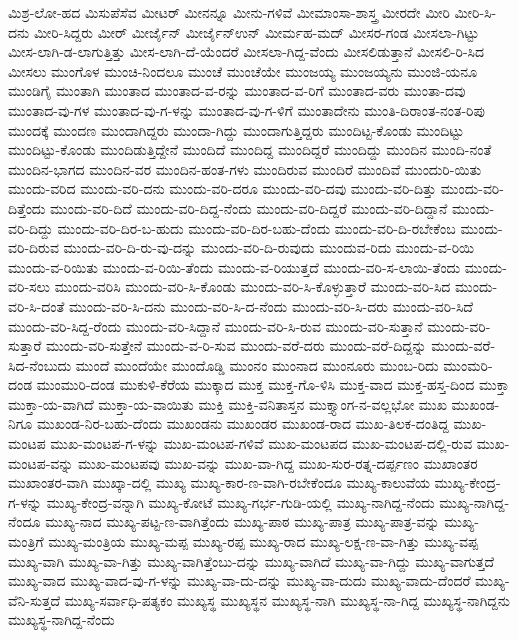 ಮಿಶ್ರ-ಲೋ-ಹದ
ಮಿಸುಪೆಸೆವ
ಮೀಟರ್
ಮೀನನ್ನೂ
ಮೀನು-ಗಳಿವೆ
ಮೀಮಾಂಸಾ-ಶಾಸ್ತ್ರ
ಮೀರದೇ
ಮೀರಿ
ಮೀರಿ-ಸಿ-ದನು
ಮೀರಿ-ಸಿದ್ದರು
ಮೀರ್
ಮೀರ್ಜೈನ್
ಮೀರ್ಜೈನ್ಉನ್
ಮೀರ್ಮಹ-ಮದ್
ಮೀಸರ-ಗಂಡ
ಮೀಸಲಾ-ಗಿಟ್ಟು
ಮೀಸ-ಲಾಗಿ-ಡ-ಲಾಗುತ್ತಿತ್ತು
ಮೀಸ-ಲಾಗಿ-ದೆ-ಯೆಂದರೆ
ಮೀಸಲಾ-ಗಿದ್ದ-ವೆಂದು
ಮೀಸಲಿಡುತ್ತಾನೆ
ಮೀಸಲಿ-ರಿ-ಸಿದ
ಮೀಸಲು
ಮುಂಗೊಳ
ಮುಂಚಿ-ನಿಂದಲೂ
ಮುಂಚೆ
ಮುಂಚೆಯೇ
ಮುಂಜಯ್ಯ
ಮುಂಜಯ್ಯನು
ಮುಂಜಿ-ಯನೂ
ಮುಂಡಿಗೈ
ಮುಂತಾಗಿ
ಮುಂತಾದ
ಮುಂತಾದ-ವ-ರನ್ನು
ಮುಂತಾದ-ವ-ರಿಗೆ
ಮುಂತಾದ-ವರು
ಮುಂತಾ-ದವು
ಮುಂತಾದ-ವು-ಗಳ
ಮುಂತಾದ-ವು-ಗ-ಳನ್ನು
ಮುಂತಾದ-ವು-ಗ-ಳಿಗೆ
ಮುಂತಾದೇನು
ಮುಂತಿ-ದಿರಾಂತ-ನಂತ-ರಿಪು
ಮುಂದಕ್ಕೆ
ಮುಂದಣ
ಮುಂದಾಗಿದ್ದರು
ಮುಂದಾ-ಗಿದ್ದು
ಮುಂದಾಗುತ್ತಿದ್ದರು
ಮುಂದಿಟ್ಟ-ಕೊಂಡು
ಮುಂದಿಟ್ಟು
ಮುಂದಿಟ್ಟು-ಕೊಂಡು
ಮುಂದಿಡುತ್ತಿದ್ದೇನೆ
ಮುಂದಿದೆ
ಮುಂದಿದ್ದ
ಮುಂದಿದ್ದರೆ
ಮುಂದಿದ್ದು
ಮುಂದಿನ
ಮುಂದಿ-ನಂತೆ
ಮುಂದಿನ-ಭಾಗದ
ಮುಂದಿನ-ವರ
ಮುಂದಿನ-ಹಂತ-ಗಳು
ಮುಂದಿರುವ
ಮುಂದಿರೆ
ಮುಂದಿವೆ
ಮುಂದುರಿ-ಯಿತು
ಮುಂದು-ವರಿದ
ಮುಂದು-ವರಿ-ದನು
ಮುಂದು-ವರಿ-ದರೂ
ಮುಂದು-ವರಿ-ದವು
ಮುಂದು-ವರಿ-ದಿತ್ತು
ಮುಂದು-ವರಿ-ದಿತ್ತೆಂದು
ಮುಂದು-ವರಿ-ದಿದೆ
ಮುಂದು-ವರಿ-ದಿದ್ದ-ನೆಂದು
ಮುಂದು-ವರಿ-ದಿದ್ದರೆ
ಮುಂದು-ವರಿ-ದಿದ್ದಾನೆ
ಮುಂದು-ವರಿ-ದಿದ್ದು
ಮುಂದು-ವರಿ-ದಿರ-ಬ-ಹುದು
ಮುಂದು-ವರಿ-ದಿರ-ಬಹು-ದೆಂದು
ಮುಂದು-ವರಿ-ದಿ-ರಬೇಕೆಂಬ
ಮುಂದು-ವರಿ-ದಿರುವ
ಮುಂದು-ವರಿ-ದಿ-ರು-ವು-ದನ್ನು
ಮುಂದು-ವರಿ-ದಿ-ರುವುದು
ಮುಂದುವ-ರಿದು
ಮುಂದು-ವ-ರಿಯಿ
ಮುಂದು-ವ-ರಿಯಿತು
ಮುಂದು-ವ-ರಿಯಿ-ತೆಂದು
ಮುಂದು-ವ-ರಿಯುತ್ತದೆ
ಮುಂದು-ವರಿ-ಸ-ಲಾಯಿ-ತೆಂದು
ಮುಂದು-ವರಿ-ಸಲು
ಮುಂದು-ವರಿಸಿ
ಮುಂದು-ವರಿ-ಸಿ-ಕೊಂಡು
ಮುಂದು-ವರಿ-ಸಿ-ಕೊಳ್ಳುತ್ತಾರೆ
ಮುಂದು-ವರಿ-ಸಿದ
ಮುಂದು-ವರಿ-ಸಿ-ದಂತೆ
ಮುಂದು-ವರಿ-ಸಿ-ದನು
ಮುಂದು-ವರಿ-ಸಿ-ದ-ನೆಂದು
ಮುಂದು-ವರಿ-ಸಿ-ದರು
ಮುಂದು-ವರಿ-ಸಿದೆ
ಮುಂದು-ವರಿ-ಸಿದ್ದ-ರೆಂದು
ಮುಂದು-ವರಿ-ಸಿದ್ದಾನೆ
ಮುಂದು-ವರಿ-ಸಿ-ರುವ
ಮುಂದು-ವರಿ-ಸುತ್ತಾನೆ
ಮುಂದು-ವರಿ-ಸುತ್ತಾರೆ
ಮುಂದು-ವರಿ-ಸುತ್ತೇನೆ
ಮುಂದು-ವ-ರಿ-ಸುವ
ಮುಂದು-ವರೆ-ದರು
ಮುಂದು-ವರೆ-ದಿದ್ದನ್ನು
ಮುಂದು-ವರೆ-ಸಿದ-ನೆಂಬುದು
ಮುಂದೆ
ಮುಂದೆಯೇ
ಮುಂದೊಡ್ಡಿ
ಮುಂನಂ
ಮುಂನಾದ
ಮುಂನೂರು
ಮುಂಬ-ರಿದು
ಮುಂಮರಿ-ದಂಡ
ಮುಂಮುರಿ-ದಂಡ
ಮುಕುಳಿ-ಕೆರೆಯ
ಮುಕ್ಕಾದ
ಮುಕ್ತ
ಮುಕ್ತ-ಗೊ-ಳಿಸಿ
ಮುಕ್ತ-ವಾದ
ಮುಕ್ತ-ಹಸ್ತ-ದಿಂದ
ಮುಕ್ತಾ
ಮುಕ್ತಾ-ಯ-ವಾಗಿದೆ
ಮುಕ್ತಾ-ಯ-ವಾಯಿತು
ಮುಕ್ತಿ
ಮುಕ್ತಿ-ವನಿತಾಸ್ತನ
ಮುಕ್ತ್ಯಾಂಗ-ನ-ವಲ್ಲಭೋ
ಮುಖ
ಮುಖಂಡ-ನಿಗೂ
ಮುಖಂಡ-ನಿರ-ಬಹು-ದೆಂದು
ಮುಖಂಡನು
ಮುಖಂಡರ
ಮುಖಂಡ-ರಾದ
ಮುಖ-ತಿಲಕ-ದಂತಿದ್ದ
ಮುಖ-ಮಂಟಪ
ಮುಖ-ಮಂಟಪ-ಗ-ಳನ್ನು
ಮುಖ-ಮಂಟಪ-ಗಳಿವೆ
ಮುಖ-ಮಂಟಪದ
ಮುಖ-ಮಂಟಪ-ದಲ್ಲಿ-ರುವ
ಮುಖ-ಮಂಟಪ-ವನ್ನು
ಮುಖ-ಮಂಟಪವು
ಮುಖ-ವನ್ನು
ಮುಖ-ವಾ-ಗಿದ್ದ
ಮುಖ-ಸುರ-ರತ್ನ-ದರ್ಪ್ಪಣಂ
ಮುಖಾಂತರ
ಮುಖಾಂತರ-ವಾಗಿ
ಮುಖ್ಕಾ-ದಲ್ಲಿ
ಮುಖ್ಯ
ಮುಖ್ಯ-ಕಾರ-ಣ-ವಾಗಿ-ರಬೇಕೆಂದೂ
ಮುಖ್ಯ-ಕಾಲುವೆಯ
ಮುಖ್ಯ-ಕೇಂದ್ರ-ಗ-ಳನ್ನು
ಮುಖ್ಯ-ಕೇಂದ್ರ-ವನ್ನಾಗಿ
ಮುಖ್ಯ-ಕೋಟೆ
ಮುಖ್ಯ-ಗರ್ಭ-ಗುಡಿ-ಯಲ್ಲಿ
ಮುಖ್ಯ-ನಾಗಿದ್ದ-ನೆಂದು
ಮುಖ್ಯ-ನಾಗಿದ್ದ-ನೆಂದೂ
ಮುಖ್ಯ-ನಾದ
ಮುಖ್ಯ-ಪಟ್ಟ-ಣ-ವಾಗಿತ್ತೆಂದು
ಮುಖ್ಯ-ಪಾಠ
ಮುಖ್ಯ-ಪಾತ್ರ
ಮುಖ್ಯ-ಪಾತ್ರ-ವನ್ನು
ಮುಖ್ಯ-ಮಂತ್ರಿಗೆ
ಮುಖ್ಯ-ಮಂತ್ರಿಯ
ಮುಖ್ಯ-ಮಪ್ಪ
ಮುಖ್ಯ-ರಪ್ಪ
ಮುಖ್ಯ-ರಾದ
ಮುಖ್ಯ-ಲಕ್ಷ-ಣ-ವಾ-ಗಿತ್ತು
ಮುಖ್ಯ-ವಪ್ಪ
ಮುಖ್ಯ-ವಾಗಿ
ಮುಖ್ಯ-ವಾ-ಗಿತ್ತು
ಮುಖ್ಯ-ವಾಗಿತ್ತೆಂಬು-ದನ್ನು
ಮುಖ್ಯ-ವಾಗಿದೆ
ಮುಖ್ಯ-ವಾ-ಗಿದ್ದು
ಮುಖ್ಯ-ವಾಗುತ್ತದೆ
ಮುಖ್ಯ-ವಾದ
ಮುಖ್ಯ-ವಾದ-ವು-ಗ-ಳನ್ನು
ಮುಖ್ಯ-ವಾ-ದು-ದನ್ನು
ಮುಖ್ಯ-ವಾ-ದುದು
ಮುಖ್ಯ-ವಾದು-ದೆಂದರೆ
ಮುಖ್ಯ-ವೆನಿ-ಸುತ್ತದೆ
ಮುಖ್ಯ-ಸರ್ವಾಧಿ-ಪತ್ಯಕಂ
ಮುಖ್ಯಸ್ಥ
ಮುಖ್ಯಸ್ಥನ
ಮುಖ್ಯಸ್ಥ-ನಾಗಿ
ಮುಖ್ಯಸ್ಥ-ನಾ-ಗಿದ್ದ
ಮುಖ್ಯಸ್ಥ-ನಾಗಿದ್ದನು
ಮುಖ್ಯಸ್ಥ-ನಾಗಿದ್ದ-ನೆಂದು
